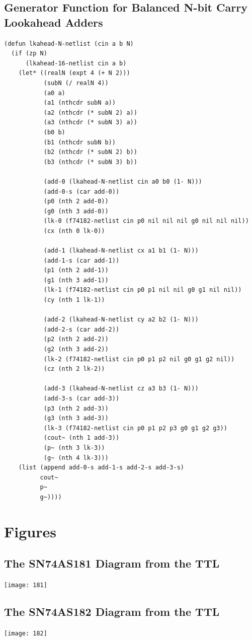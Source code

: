 \documentclass[fleqn,10pt]{SelfArx} %
\begin{document}
\subsection*{Generator Function for Balanced N-bit Carry Lookahead Adders}
\begin{lstlisting}
(defun lkahead-N-netlist (cin a b N)
  (if (zp N)
      (lkahead-16-netlist cin a b)
    (let* ((realN (expt 4 (+ N 2)))
           (subN (/ realN 4))
           (a0 a)
           (a1 (nthcdr subN a))
           (a2 (nthcdr (* subN 2) a))
           (a3 (nthcdr (* subN 3) a))
           (b0 b)
           (b1 (nthcdr subN b))
           (b2 (nthcdr (* subN 2) b))
           (b3 (nthcdr (* subN 3) b))

           (add-0 (lkahead-N-netlist cin a0 b0 (1- N)))
           (add-0-s (car add-0))
           (p0 (nth 2 add-0))
           (g0 (nth 3 add-0))
           (lk-0 (f74182-netlist cin p0 nil nil nil g0 nil nil nil))
           (cx (nth 0 lk-0))

           (add-1 (lkahead-N-netlist cx a1 b1 (1- N)))
           (add-1-s (car add-1))
           (p1 (nth 2 add-1))
           (g1 (nth 3 add-1))
           (lk-1 (f74182-netlist cin p0 p1 nil nil g0 g1 nil nil))
           (cy (nth 1 lk-1))

           (add-2 (lkahead-N-netlist cy a2 b2 (1- N)))
           (add-2-s (car add-2))
           (p2 (nth 2 add-2))
           (g2 (nth 3 add-2))
           (lk-2 (f74182-netlist cin p0 p1 p2 nil g0 g1 g2 nil))
           (cz (nth 2 lk-2))

           (add-3 (lkahead-N-netlist cz a3 b3 (1- N)))
           (add-3-s (car add-3))
           (p3 (nth 2 add-3))
           (g3 (nth 3 add-3))
           (lk-3 (f74182-netlist cin p0 p1 p2 p3 g0 g1 g2 g3))
           (cout~ (nth 1 add-3))
           (p~ (nth 3 lk-3))
           (g~ (nth 4 lk-3)))
    (list (append add-0-s add-1-s add-2-s add-3-s)
          cout~
          p~
          g~))))
\end{lstlisting}

\section{Figures}
\subsection*{The SN74AS181 Diagram from the TTL \cite{TTL}}
\texttt{[image: 181]}


\subsection*{The SN74AS182 Diagram from the TTL \cite{TTL}}
\texttt{[image: 182]}
\end{document}
